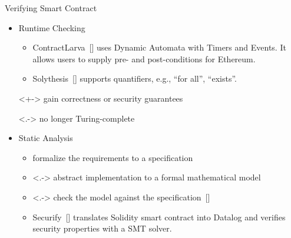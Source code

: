 \documentclass[xcolor=svgnames]{beamer}
\begin{document}
\begin{frame}{Verifying Smart Contract}
\onslide<+->
\begin{itemize}
\item Runtime Checking
\begin{itemize}
\item<+-> ContractLarva~[] uses Dynamic Automata with Timers and Events. It allows users to supply pre- and post-conditions for Ethereum.
\item<+-> Solythesis~[] supports quantifiers, e.g., ``for all'', ``exists''. 
\end{itemize}
\item[]<+-> {\color{Green} \checkmark} gain correctness or security guarantees
\item[]<.-> {\color{red} \texttimes} no longer Turing-complete


\item Static Analysis 
\begin{itemize}

\item<+-> formalize the requirements to a specification
\item<.-> abstract implementation to a formal mathematical model
\item<.-> check the model against the specification~[]
\item<+-> Securify~[] translates Solidity smart contract into Datalog and verifies security properties with a SMT solver.

\end{itemize}

\end{itemize}

\end{frame}
\end{document}
